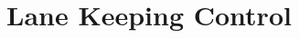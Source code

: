 \documentclass{relatorio}
\title{Lane Keeping Control}
\begin{document}
  
  
  \maketitle{}

  
  
  
  
  \nocite{*}
\end{document}
